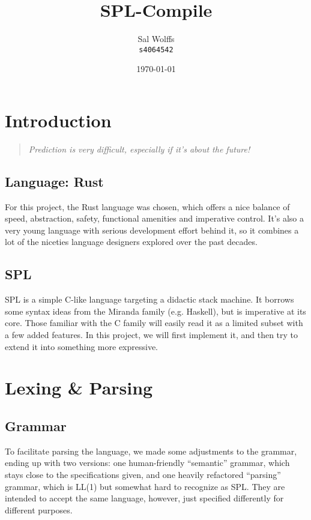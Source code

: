 \documentclass{report}
\author{%
	Sal Wolffs\\
	\small\texttt{s4064542}
}
\date{\today}
\title{SPL-Compile}
\begin{document}
\maketitle%

\tableofcontents%

\chapter{Introduction}
\begin{quote}
	\it
    Prediction is very difficult, especially if it's about the future!
\end{quote}
\section{Language: Rust}
For this project, the Rust language was chosen, which offers a nice balance of
speed, abstraction, safety, functional amenities and imperative control. It's
also a very young language with serious development effort behind it, so it
combines a lot of the niceties language designers explored over the past
decades.

\section{SPL}
SPL is a simple C-like language targeting a didactic stack machine. It borrows
some syntax ideas from the Miranda family (e.g. Haskell), but is imperative at
its core. Those familiar with the C family will easily read it as a limited
subset with a few added features. In this project, we will first implement it,
and then try to extend it into something more expressive.

\chapter{Lexing \& Parsing}
\section{Grammar}
To facilitate parsing the language, we made some adjustments to the grammar,
ending up with two versions: one human-friendly ``semantic'' grammar, which
stays close to the specifications given, and one heavily refactored ``parsing''
grammar, which is LL(1) but somewhat hard to recognize as SPL. They are intended
to accept the same language, however, just specified differently for different
purposes.
\end{document}
